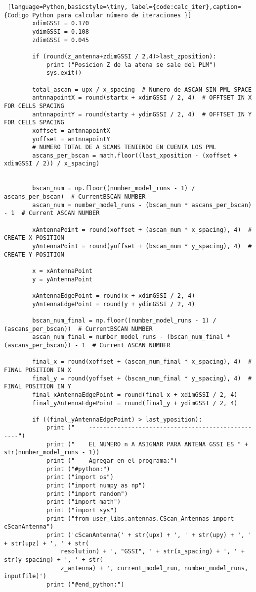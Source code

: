 \begin{lstlisting} [language=Python,basicstyle=\tiny, label={code:calc_iter},caption= {Codigo Python para calcular número de iteraciones }]
        xdimGSSI = 0.170
        ydimGSSI = 0.108
        zdimGSSI = 0.045

        if (round(z_antenna+zdimGSSI / 2,4)>last_zposition):
            print ("Posicion Z de la atena se sale del PLM")
            sys.exit()

        total_ascan = upx / x_spacing  # Numero de ASCAN SIN PML SPACE
        antnnapointX = round(startx + xdimGSSI / 2, 4)  # OFFTSET IN X FOR CELLS SPACING
        antnnapointY = round(starty + ydimGSSI / 2, 4)  # OFFTSET IN Y FOR CELLS SPACING
        xoffset = antnnapointX
        yoffset = antnnapointY
        # NUMERO TOTAL DE A SCANS TENIENDO EN CUENTA LOS PML
        ascans_per_bscan = math.floor((last_xposition - (xoffset + xdimGSSI / 2)) / x_spacing)


        bscan_num = np.floor((number_model_runs - 1) / ascans_per_bscan)  # CurrentBSCAN NUMBER
        ascan_num = number_model_runs - (bscan_num * ascans_per_bscan) - 1  # Current ASCAN NUMBER

        xAntennaPoint = round(xoffset + (ascan_num * x_spacing), 4)  # CREATE X POSITION
        yAntennaPoint = round(yoffset + (bscan_num * y_spacing), 4)  # CREATE Y POSITION

        x = xAntennaPoint
        y = yAntennaPoint

        xAntennaEdgePoint = round(x + xdimGSSI / 2, 4)
        yAntennaEdgePoint = round(y + ydimGSSI / 2, 4)

        bscan_num_final = np.floor((number_model_runs - 1) / (ascans_per_bscan))  # CurrentBSCAN NUMBER
        ascan_num_final = number_model_runs - (bscan_num_final * (ascans_per_bscan)) - 1  # Current ASCAN NUMBER

        final_x = round(xoffset + (ascan_num_final * x_spacing), 4)  # FINAL POSITION IN X
        final_y = round(yoffset + (bscan_num_final * y_spacing), 4)  # FINAL POSITION IN Y
        final_xAntennaEdgePoint = round(final_x + xdimGSSI / 2, 4)
        final_yAntennaEdgePoint = round(final_y + ydimGSSI / 2, 4)

        if ((final_yAntennaEdgePoint) > last_yposition):
            print ("    --------------------------------------------------")
            print ("    EL NUMERO n A ASIGNAR PARA ANTENA GSSI ES " + str(number_model_runs - 1))
            print ("    Agregar en el programa:")
            print ("#python:")
            print ("import os")
            print ("import numpy as np")
            print ("import random")
            print ("import math")
            print ("import sys")
            print ("from user_libs.antennas.CScan_Antennas import cScanAntenna")
            print ('cScanAntenna(' + str(upx) + ', ' + str(upy) + ', ' + str(upz) + ', ' + str(
                resolution) + ', "GSSI", ' + str(x_spacing) + ', ' + str(y_spacing) + ', ' + str(
                z_antenna) + ', current_model_run, number_model_runs, inputfile)')
            print ("#end_python:")


\end{lstlisting}
